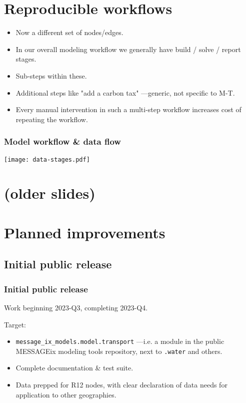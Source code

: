 \documentclass[12pt,aspectratio=169]{beamer}
\begin{document}
\section{Reproducible workflows}

\begin{frame}[allowframebreaks]
\begin{itemize}
  \item Now a different set of nodes/edges.
  \item In our overall modeling workflow we generally have build / solve / report stages.
  \item Sub-steps within these.
  \item Additional steps like "add a carbon tax" —generic, not specific to M-T.
  \item Every manual intervention in such a multi-step workflow increases cost of repeating the workflow.
\end{itemize}

\end{frame}

\begin{frame}
\frametitle{Model workflow \& data flow}
\hspace*{-10mm}\texttt{[image: data-stages.pdf]}
\end{frame}

\section{(older slides)}



\section{Planned improvements}

\subsection{Initial public release}

\begin{frame}
  \frametitle{Initial public release}

  Work beginning 2023-Q3, completing 2023-Q4.

  \bigskip
  Target:
  \begin{itemize}
    \item \texttt{message\_ix\_models.model.transport} —i.e. a module in the public MESSAGEix modeling tools repository, next to \texttt{.water} and others.
    \item Complete documentation \& test suite.
    \item Data prepped for R12 nodes, with clear declaration of data needs for application to other geographies.
  \end{itemize}
\end{frame}
\end{document}
